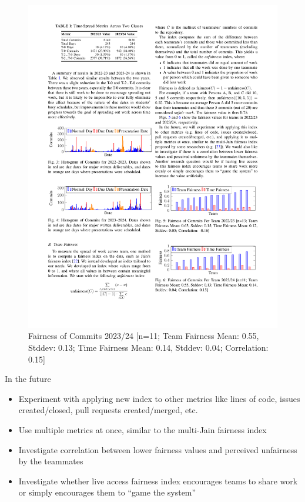 \documentclass[poster, a1, plainboxedsections]{sciposter}
\begin{document}
\begin{multicols}{2}
\begin{figure}[h]
\centering
\includegraphics[width=1.0\linewidth]{../figures/FairnessCommits_23_24.pdf}
\caption{Fairness of Commits 2023/24 [n=11; Team Fairness Mean: 0.55, Stddev: 0.13; Time Fairness Mean: 0.14, Stddev: 0.04; Correlation: 0.15]}\label{Fig:Fairness2023/24}
\end{figure}

In the future
\begin{itemize}
    \item Experiment with applying new index to other metrics like lines of
    code, issues created/closed, pull requests created/merged, etc.
    \item Use multiple metrics at once, similar to the multi-Jain fairness
    index 
    \item Investigate correlation between lower fairness values and perceived
    unfairness by the teammates
    \item Investigate whether live access fairness index encourages teams to share
    work or simply encourages them to ``game the system''
\end{itemize}


\end{multicols}
\end{document}
